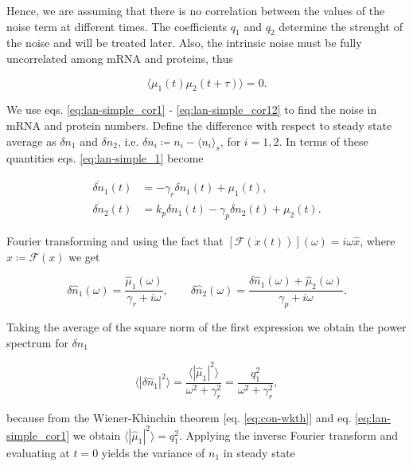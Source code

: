 Hence, we are assuming that there is no correlation between the values of the noise term at different times. The coefficients $q_1$ and $q_2$ determine the strenght of the noise and will be treated later. Also, the intrinsic noise must be fully uncorrelated among mRNA and proteins, thus

\begin{equation}
  \langle\mu_1(t)\mu_2(t+\tau)\rangle = 0. \label{eq:lan-simple_cor12}
\end{equation}

We use eqs. \eqref{eq:lan-simple_cor1} - \eqref{eq:lan-simple_cor12} to find the noise in mRNA and protein numbers. Define the difference with respect to steady state average as $\delta n_1$ and $\delta n_2$, i.e. $\delta n_i \coloneqq n_i - \langle n_i\rangle_s$, for $i=1,2$. In terms of these quantities eqs. \eqref{eq:lan-simple_1} become

\begin{align*}
  \dot{\delta n_1}(t) &= -\gamma_r\delta n_1(t) + \mu_1(t),\\
  \dot{\delta n_2}(t) &= k_p\delta n_1(t) -\gamma_p\delta n_2(t) + \mu_2(t).
\end{align*}

Fourier transforming and using the fact that $\left[\mathscr{F}(\dot{x}(t))\right](\omega) = i\omega \hat{x}$, where $\hat{x}\coloneqq\mathscr{F}(x)$ we get 

\begin{equation}
  \label{eq:lan-nfourier}
  \delta\hat{n}_1(\omega) = \frac{\hat{\mu}_1(\omega)}{\gamma_r+i\omega},\quad\quad \delta\hat{n}_2(\omega) = \frac{\delta\hat{n}_1(\omega) + \hat{\mu}_2(\omega)}{\gamma_p+i\omega}.
\end{equation}

Taking the average of the square norm of the first expression we obtain the power spectrum for $\delta n_1$

\begin{equation}
  \label{eq:lan-simple_psd1}
  \langle|\delta\hat{n}_1|^2\rangle = \frac{\langle|\hat{\mu}_1|^2\rangle}{\omega^2+\gamma_r^2} = \frac{q_1^2}{\omega^2+\gamma_r^2},
\end{equation}

because from the Wiener-Khinchin theorem [eq. \eqref{eq:con-wkth}] and eq. \eqref{eq:lan-simple_cor1} we obtain $\langle|\hat{\mu}_1|^2\rangle = q_1^2$. Applying the inverse Fourier transform and evaluating at $t=0$ yields the variance of $n_1$ in steady state

